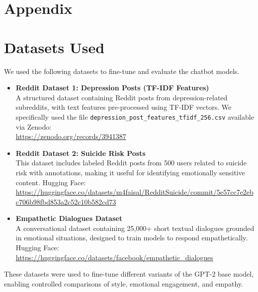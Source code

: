 \appendix

\section*{Appendix}

\section{Datasets Used}
\label{appendix:datasets}

We used the following datasets to fine-tune and evaluate the chatbot models.

\begin{itemize}
    \item \textbf{Reddit Dataset 1: Depression Posts (TF-IDF Features)} \\
    A structured dataset containing Reddit posts from depression-related subreddits, with text features pre-processed using TF-IDF vectors. We specifically used the file \texttt{depression\_post\_features\_tfidf\_256.csv} available via Zenodo: \\
    \url{https://zenodo.org/records/3941387}
    
    \item \textbf{Reddit Dataset 2: Suicide Risk Posts} \\
    This dataset includes labeled Reddit posts from 500 users related to suicide risk with annotations, making it useful for identifying emotionally sensitive content. Hugging Face: \\
    \url{https://huggingface.co/datasets/m4faisal/RedditSuicide/commit/5e57cc7e2ebc706b98fbd853a2c52c10b582cd73}
    
    \item \textbf{Empathetic Dialogues Dataset} \\
    A conversational dataset containing 25,000+ short textual dialogues grounded in emotional situations, designed to train models to respond empathetically. Hugging Face: \\
    \url{https://huggingface.co/datasets/facebook/empathetic_dialogues}
\end{itemize}

These datasets were used to fine-tune different variants of the GPT-2 base model, enabling controlled comparisons of style, emotional engagement, and empathy.
